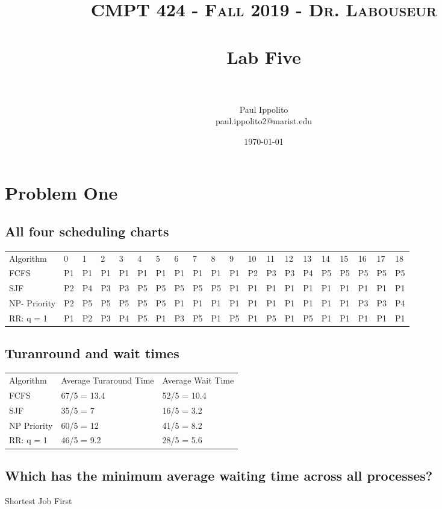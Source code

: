 \documentclass[letterpaper, 10pt,DIV=13]{scrartcl}
\title{	
   \normalfont \normalsize 
   \textsc{CMPT 424 - Fall 2019 - Dr. Labouseur} \\[10pt] %
   \horrule{0.5pt} \\[0.25cm] 	%
   \huge Lab Five  \\     	    %
   \horrule{0.5pt} \\[0.25cm] 	%
}
\author{Paul Ippolito \\ \normalsize paul.ippolito2@marist.edu}
\date{\normalsize\today} 	%
\numberwithin{equation}{section} %
\numberwithin{figure}{section} %
\numberwithin{table}{section} %
\begin{document}
\maketitle %

\section{Problem One}
\subsection{All four scheduling charts}

\begin{table}[]
\begin{tabular}{llllllllllllllllllll}
Algorithm    & 0  & 1  & 2  & 3  & 4  & 5  & 6  & 7  & 8  & 9  & 10 & 11 & 12 & 13 & 14 & 15 & 16 & 17 & 18 \\
FCFS         & P1 & P1 & P1 & P1 & P1 & P1 & P1 & P1 & P1 & P1 & P2 & P3 & P3 & P4 & P5 & P5 & P5 & P5 & P5 \\
SJF          & P2 & P4 & P3 & P3 & P5 & P5 & P5 & P5 & P5 & P1 & P1 & P1 & P1 & P1 & P1 & P1 & P1 & P1 & P1 \\
NP- Priority & P2 & P5 & P5 & P5 & P5 & P5 & P1 & P1 & P1 & P1 & P1 & P1 & P1 & P1 & P1 & P1 & P3 & P3 & P4 \\
RR: q = 1    & P1 & P2 & P3 & P4 & P5 & P1 & P3 & P5 & P1 & P5 & P1 & P5 & P1 & P5 & P1 & P1 & P1 & P1 & P1
\end{tabular}
\end{table}


\subsection{Turanround and wait times}

\begin{table}[]
\begin{tabular}{lll}
Algorithm   & Average Turaround Time & Average Wait Time \\
FCFS        & 67/5 = 13.4            & 52/5 = 10.4       \\
SJF         & 35/5 = 7               & 16/5 = 3.2        \\
NP Priority & 60/5 = 12              & 41/5 = 8.2        \\
RR: q = 1   & 46/5 = 9.2             & 28/5 = 5.6       
\end{tabular}
\end{table}

\subsection{Which has the minimum average waiting time across all processes?}
Shortest Job First
\end{document}
